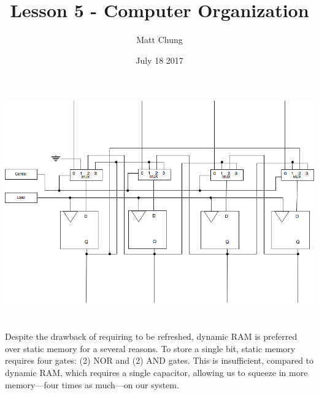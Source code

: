 \documentclass{article}
\title{Lesson 5 - Computer Organization}
\author{Matt Chung}
\date{July 18 2017}
\begin{document}
\maketitle

\section{}
\includegraphics[scale=.50]{q1}

\section{}
\section{}
Despite the drawback of requiring to be refreshed, dynamic RAM is preferred over static memory for a several reasons. To store a single bit, static memory requires four gates: (2) NOR and (2) AND gates. This is insufficient, compared to dynamic RAM, which requires a single capacitor, allowing us to squeeze in more memory—four times as much—on our system.
\section{}
\section{}
\end{document}
